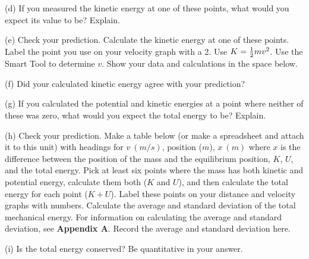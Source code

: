 (d) If you measured the kinetic energy at one of these points, what would you
expect its value to be? Explain.
\vspace{20mm}

\newpage

(e) Check your prediction. Calculate the kinetic energy at one of these points.
Label the point you use on your velocity graph with a 2. Use 
$K = {1\over 2} mv^{2}$.
Use the Smart Tool to determine $v$. Show your data and calculations in the space
below.
\vspace{20mm}

(f) Did your calculated kinetic energy agree with your prediction?
\vspace{20mm}

(g) If you calculated the potential and kinetic energies at a point where neither
of these was zero, what would you expect the total energy to be? Explain.
\vspace{20mm}

(h) Check your prediction. Make a table below (or make a spreadsheet and attach it to this unit)
with headings for $v~(m/s)$, position ($m$), $x~(m)$ where $x$ is the difference between the position
of the mass and the equilibrium position, $K$, $U$, and the total energy.
Pick at least six points where the mass has both kinetic and
potential energy, calculate them both ($K$ and $U$), and then calculate the total energy for each point ($K+U$). 
Label these points on your distance
and velocity graphs with numbers. 
Calculate the average and standard deviation of the total mechanical energy.
For information on calculating the average and
standard deviation, see \textbf{Appendix A}. Record the average and standard deviation here.
\vspace{60mm}

(i)  Is the total energy conserved?  Be quantitative in your answer.

